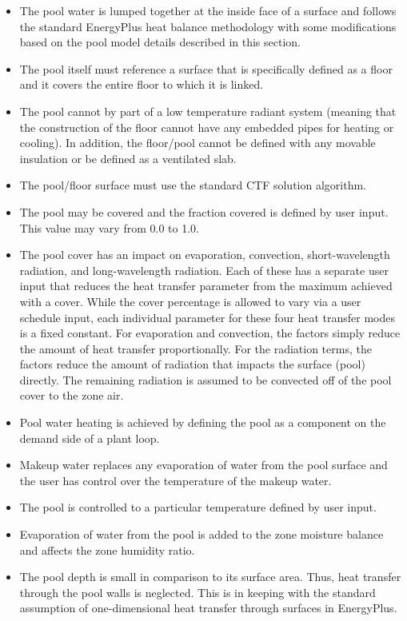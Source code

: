 \begin{itemize}
\tightlist
\item
  The pool water is lumped together at the inside face of a surface and follows the standard EnergyPlus heat balance methodology with some modifications based on the pool model details described in this section.
\item
  The pool itself must reference a surface that is specifically defined as a floor and it covers the entire floor to which it is linked.
\item
  The pool cannot by part of a low temperature radiant system (meaning that the construction of the floor cannot have any embedded pipes for heating or cooling). In addition, the floor/pool cannot be defined with any movable insulation or be defined as a ventilated slab.
\item
  The pool/floor surface must use the standard CTF solution algorithm.
\item
  The pool may be covered and the fraction covered is defined by user input. This value may vary from 0.0 to 1.0.
\item
  The pool cover has an impact on evaporation, convection, short-wavelength radiation, and long-wavelength radiation. Each of these has a separate user input that reduces the heat transfer parameter from the maximum achieved with a cover. While the cover percentage is allowed to vary via a user schedule input, each individual parameter for these four heat transfer modes is a fixed constant. For evaporation and convection, the factors simply reduce the amount of heat transfer proportionally. For the radiation terms, the factors reduce the amount of radiation that impacts the surface (pool) directly. The remaining radiation is assumed to be convected off of the pool cover to the zone air.
\item
  Pool water heating is achieved by defining the pool as a component on the demand side of a plant loop.
\item
  Makeup water replaces any evaporation of water from the pool surface and the user has control over the temperature of the makeup water.
\item
  The pool is controlled to a particular temperature defined by user input.
\item
  Evaporation of water from the pool is added to the zone moisture balance and affects the zone humidity ratio.
\item
  The pool depth is small in comparison to its surface area. Thus, heat transfer through the pool walls is neglected. This is in keeping with the standard assumption of one-dimensional heat transfer through surfaces in EnergyPlus.
\end{itemize}

